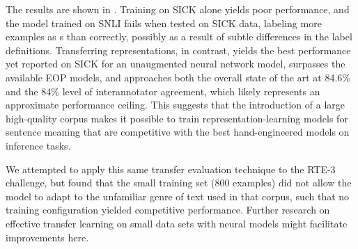 The results are shown in . Training on SICK alone yields poor performance, and the model trained on SNLI fails when tested on SICK data, labeling more  examples as s than correctly, possibly as a result of subtle differences in the label definitions. Transferring representations, in contrast, yields the best performance yet reported on SICK for an unaugmented neural network model, surpasses the available EOP models, and approaches both the overall state of the art at 84.6\% \cite{lai2014illinois} and the 84\% level of interannotator agreement, which likely represents an approximate performance ceiling. This suggests that the introduction of a large high-quality corpus makes it  possible to train representation-learning models for sentence meaning that are competitive with the best hand-engineered models on inference tasks.

We attempted to apply this same transfer evaluation technique to the RTE-3 challenge, but found that the small training set (800 examples) did not allow the model to adapt to the unfamiliar genre of text used in that corpus, such that no training configuration yielded competitive performance.
Further research on effective transfer learning on small data sets with neural models might facilitate improvements here.



